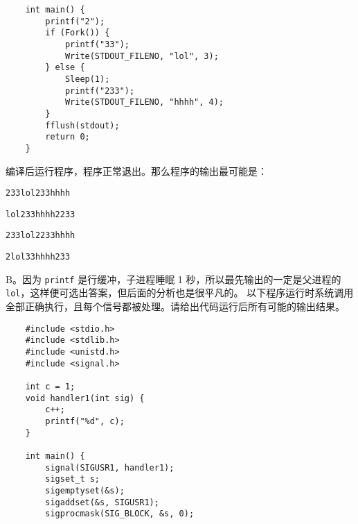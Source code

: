 \begin{problems}
\begin{verbatim}
    int main() {
        printf("2");
        if (Fork()) {
            printf("33");
            Write(STDOUT_FILENO, "lol", 3);
        } else {
            Sleep(1);
            printf("233");
            Write(STDOUT_FILENO, "hhhh", 4);
        }
        fflush(stdout);
        return 0;
    }
        \end{verbatim}
        编译后运行程序，程序正常退出。那么程序的输出最可能是：
        \begin{choices}
            \item \verb|233lol233hhhh|
            \item \verb|lol233hhhh2233|
            \item \verb|233lol2233hhhh|
            \item \verb|2lol33hhhh233|
        \end{choices}
        \sol B。因为 \verb|printf| 是行缓冲，子进程睡眠 1 秒，所以最先输出的一定是父进程的 \verb|lol|，这样便可选出答案，但后面的分析也是很平凡的。
         以下程序运行时系统调用全部正确执行，且每个信号都被处理。请给出代码运行后所有可能的输出结果。
        \begin{verbatim}
    #include <stdio.h>
    #include <stdlib.h>
    #include <unistd.h>
    #include <signal.h>

    int c = 1;
    void handler1(int sig) {
        c++;
        printf("%d", c);
    }

    int main() {
        signal(SIGUSR1, handler1);
        sigset_t s;
        sigemptyset(&s);
        sigaddset(&s, SIGUSR1);
        sigprocmask(SIG_BLOCK, &s, 0);


\end{verbatim}
\end{problems}
